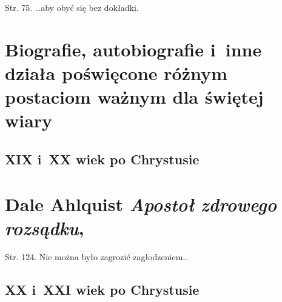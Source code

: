 \documentclass[a4paper,11pt]{article}
\numberwithin{equation}{section}
\begin{document}


Str. 75. \ldots aby obyć się bez dokładki.


\VerSpaceOne










\newpage

\section{Biografie, autobiografie i~inne działa poświęcone
  różnym postaciom ważnym dla świętej wiary}

\VerSpaceTwo



\subsection{XIX i~XX wiek po Chrystusie}

\VerSpaceThree



\section{Dale Ahlquist \textit{Apostoł zdrowego rozsądku},
  \parencite{}}





Str. 124. Nie można było zagrozić zagłodzeniem\ldots


\VerSpaceTwo










\subsection{XX i~XXI wiek po Chrystusie}

\VerSpaceThree



\end{document}
